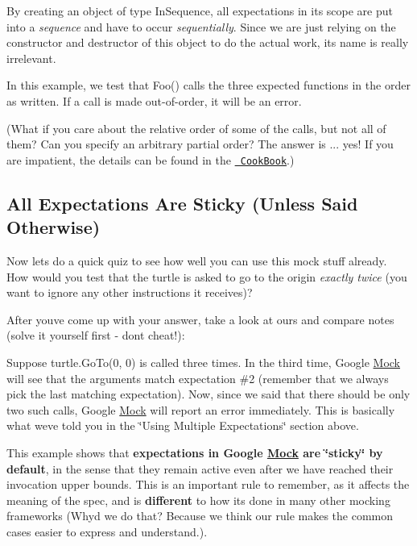 By creating an object of type {\ttfamily In\+Sequence}, all expectations in its scope are put into a {\itshape sequence} and have to occur {\itshape sequentially}. Since we are just relying on the constructor and destructor of this object to do the actual work, its name is really irrelevant.

In this example, we test that {\ttfamily Foo()} calls the three expected functions in the order as written. If a call is made out-\/of-\/order, it will be an error.

(What if you care about the relative order of some of the calls, but not all of them? Can you specify an arbitrary partial order? The answer is ... yes! If you are impatient, the details can be found in the \href{CookBook.md\#expecting-partially-ordered-calls}{\texttt{ Cook\+Book}}.)

\subsection*{All Expectations Are Sticky (Unless Said Otherwise)}

Now let\textquotesingle{}s do a quick quiz to see how well you can use this mock stuff already. How would you test that the turtle is asked to go to the origin {\itshape exactly twice} (you want to ignore any other instructions it receives)?

After you\textquotesingle{}ve come up with your answer, take a look at ours and compare notes (solve it yourself first -\/ don\textquotesingle{}t cheat!)\+:


\begin{DoxyCode}{0}
\end{DoxyCode}


Suppose {\ttfamily turtle.\+Go\+To(0, 0)} is called three times. In the third time, Google \mbox{\hyperlink{classMock}{Mock}} will see that the arguments match expectation \#2 (remember that we always pick the last matching expectation). Now, since we said that there should be only two such calls, Google \mbox{\hyperlink{classMock}{Mock}} will report an error immediately. This is basically what we\textquotesingle{}ve told you in the \char`\"{}\+Using Multiple Expectations\char`\"{} section above.

This example shows that {\bfseries{expectations in Google \mbox{\hyperlink{classMock}{Mock}} are \char`\"{}sticky\char`\"{} by default}}, in the sense that they remain active even after we have reached their invocation upper bounds. This is an important rule to remember, as it affects the meaning of the spec, and is {\bfseries{different}} to how it\textquotesingle{}s done in many other mocking frameworks (Why\textquotesingle{}d we do that? Because we think our rule makes the common cases easier to express and understand.).

